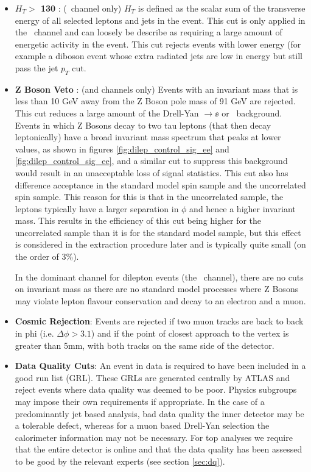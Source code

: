 \begin{itemize}
  \item \textbf{$H_T >$ 130 \GeV }: (\emu\ channel only) $H_T$ is defined as the scalar sum of the transverse energy of all selected leptons and jets in the event. This cut is only applied in the \emu\ channel and can loosely be describe as requiring a large amount of energetic activity in the event. This cut rejects events with lower energy (for example a diboson event whose extra radiated jets are low in energy but still pass the jet $p_T$ cut.

  \item \textbf{Z Boson Veto }: (\ee and \mumu channels only) Events with an invariant mass that is less than 10 GeV away from the Z Boson pole mass of 91 GeV are rejected. This cut reduces a large amount of the Drell-Yan $\rightarrow \ee$ or \mumu\ background. Events in which Z Bosons decay to two tau leptons (that then decay leptonically) have a broad invariant mass spectrum that peaks at lower values, as shown in figures \ref{fig:dilep_control_sig_ee} and \ref{fig:dilep_control_sig_ee}, and a similar cut to suppress this background would result in an unacceptable loss of signal statistics. This cut also has difference acceptance in the standard model spin sample and the uncorrelated spin sample. This reason for this is that in the uncorrelated sample, the leptons typically have a larger separation in $\phi$ and hence a higher invariant mass. This results in the efficiency of this cut being higher for the uncorrelated sample than it is for the standard model sample, but this effect is considered in the extraction procedure later and is typically quite small (on the order of 3\%).

In the dominant channel for dilepton events (the \emu\ channel), there are no cuts on invariant mass as there are no standard model processes where Z Bosons may violate lepton flavour conservation and decay to an electron and a muon.

  \item \textbf{Cosmic Rejection}: Events are rejected if two muon tracks are back to back in phi (i.e. $\Delta\phi > 3.1$) and if the point of closest approach to the vertex is greater than 5mm, with both tracks on the same side of the detector. 

  \item \textbf{Data Quality Cuts}: An event in data is required to have been included in a good run list (GRL). These GRLs are generated centrally by ATLAS and reject events where data quality was deemed to be poor. Physics subgroups may impose their own requirements if appropriate. In the case of a predominantly jet based analysis, bad data quality the inner detector may be a tolerable defect, whereas for a muon based Drell-Yan selection the calorimeter information may not be necessary. For top analyses we require that the entire detector is online and that the data quality has been assessed to be good by the relevant experts (see section \ref{sec:dq}).


\end{itemize}
